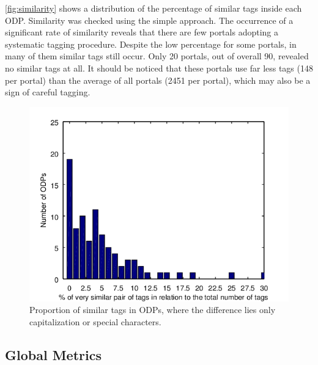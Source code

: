 \documentclass[conference]{IEEEtran}
\begin{document}
\autoref{fig:similarity} shows a distribution of the percentage of similar tags inside each ODP.
Similarity was checked using the simple approach.
The occurrence of a significant rate of similarity reveals that there are few portals adopting a systematic tagging procedure.
Despite the low percentage for some portals, in many of them similar tags still occur.
Only 20 portals, out of overall 90, revealed no similar tags at all. 
It should be noticed that these portals use far less tags (148 per portal) than the average of all portals (2451 per portal), which may also be a sign of careful tagging.

\begin{figure}[tb]
\begin{center}
\includegraphics[width=\columnwidth]{images/similarity.png}
\caption{Proportion of similar tags in ODPs, where the difference lies only capitalization or special characters.}
\label{fig:similarity}
\end{center}
\end{figure}



\subsection{Global Metrics}
\end{document}
